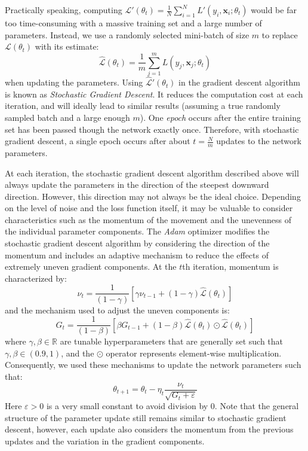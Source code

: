 \documentclass [MAS] {uclathes}
\begin{document}
Practically speaking, computing $\mathcal{L}'(\theta_t) = \frac{1}{N} \sum_{i=1}^{N} L'(y_i, \mathbf{x}_i; \theta_t)$ would be far too time-consuming with a massive training set and a large number of parameters. Instead, we use a randomly selected mini-batch of size $m$ to replace $\mathcal{L}(\theta_t)$ with its estimate: $$\hat{\mathcal{L}}(\theta_t) = \frac{1}{m} \sum_{j=1}^{m} L(y_j, \mathbf{x}_j; \theta_t)$$ when updating the parameters. Using $\hat{\mathcal{L}}'(\theta_t)$ in the gradient descent algorithm is known as \textit{Stochastic Gradient Descent}. It reduces the computation cost at each iteration, and will ideally lead to similar results (assuming a true randomly sampled batch and a large enough $m$). One \textit{epoch} occurs after the entire training set has been passed though the network exactly once. Therefore, with stochastic gradient descent, a single epoch occurs after about $t=\frac{N}{m}$ updates to the network parameters.

At each iteration, the stochastic gradient descent algorithm described above will always update the parameters in the direction of the steepest downward direction. However, this direction may not always be the ideal choice. Depending on the level of noise and the loss function itself, it may be valuable to consider characteristics such as the momentum of the movement and the unevenness of the individual parameter components. The \textit{Adam} optimizer modifies the stochastic gradient descent algorithm by considering the direction of the momentum and includes an adaptive mechanism to reduce the effects of extremely uneven gradient components. At the $t$th iteration, momentum is characterized by: $$\nu_t = \frac{1}{(1-\gamma)} \left[ \gamma \nu_{t-1} + (1-\gamma)\hat{\mathcal{L}}(\theta_t) \right]$$ and the mechanism used to adjust the uneven components is: $$G_t = \frac{1}{(1-\beta)} \left[ \beta G_{t-1} + (1-\beta)\hat{\mathcal{L}}(\theta_t) \odot \hat{\mathcal{L}}(\theta_t)\right]$$ where $\gamma, \beta \in \mathbb{R}$ are tunable hyperparameters that are generally set such that $\gamma, \beta \in (0.9, 1)$, and the $\odot$ operator represents element-wise multiplication. Consequently, we used these mechanisms to update the network parameters such that: $$\theta_{t+1} = \theta_{t} - \eta_t \frac{\nu_t}{\sqrt{G_t + \varepsilon}}$$ Here $\varepsilon>0$ is a very small constant to avoid division by 0. Note that the general structure of the parameter update still remains similar to stochastic gradient descent, however, each update also considers the momentum from the previous updates and the variation in the gradient components.
\end{document}

